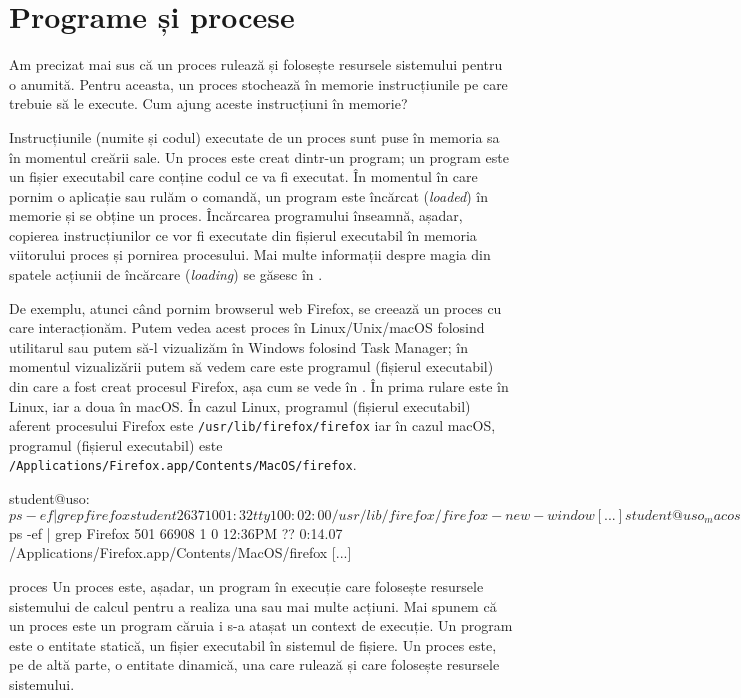\section{Programe și procese}
\label{sec:process:process-program}

Am precizat mai sus că un proces rulează și folosește resursele sistemului
pentru o anumită. Pentru aceasta, un proces stochează în memorie
instrucțiunile pe care trebuie să le execute. Cum ajung aceste instrucțiuni în
memorie?

Instrucțiunile (numite și codul) executate de un proces sunt puse în memoria sa
în momentul creării sale. Un proces este creat dintr-un program; un program este
un fișier executabil care conține codul ce va fi executat. În momentul în care
pornim o aplicație sau rulăm o comandă, un program este încărcat
(\textit{loaded}) în memorie și se obține un proces. Încărcarea programului
înseamnă, așadar, copierea instrucțiunilor ce vor fi executate din fișierul
executabil în memoria viitorului proces și pornirea procesului. Mai multe
informații despre magia din spatele acțiunii de încărcare (\textit{loading}) se
găsesc în .

De exemplu, atunci când pornim browserul web Firefox, se creează un proces cu
care interacționăm. Putem vedea acest proces în Linux/Unix/macOS folosind
utilitarul  sau putem să-l vizualizăm în Windows folosind Task Manager; în
momentul vizualizării putem să vedem care este programul (fișierul executabil)
din care a fost creat procesul Firefox, așa cum se vede în .
În  prima rulare este în Linux, iar a doua în macOS. În cazul Linux, programul (fișierul executabil) aferent procesului Firefox este \texttt{/usr/lib/firefox/firefox} iar în cazul macOS, programul (fișierul executabil) este \texttt{/Applications/Firefox.app/Contents/MacOS/firefox}.

\begin{screen}[caption={Fișierul executabil al unui process},label={lst:process:exec-for-process}]
student@uso:~$ ps -ef | grep firefox
student   2637     1  0 01:32 tty1     00:02:00 /usr/lib/firefox/firefox -new-window
[...]
student@uso_macos:~$ ps -ef | grep Firefox
501 66908     1   0 12:36PM ??         0:14.07 /Applications/Firefox.app/Contents/MacOS/firefox
[...]
\end{screen}

\begin{definition}{proces}
Un proces este, așadar, un program în execuție care folosește resursele
sistemului de calcul pentru a realiza una sau mai multe acțiuni. Mai
spunem că un proces este un program căruia i s-a atașat un context de
execuție. Un program este o entitate statică, un fișier executabil în
sistemul de fișiere. Un proces este, pe de altă parte, o entitate
dinamică, una care rulează și care folosește resursele sistemului.
\end{definition}

